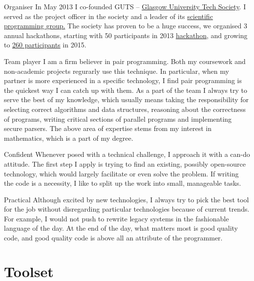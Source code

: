 \documentclass{tccv}
\begin{document}
\begin{skillist}
\item{Organiser} {In May 2013 I co-founded GUTS -- \href{http://gutechsoc.com}{Glasgow University Tech Society}. I served as the project officer in the society and a leader of its \href{http://fb.com/groups/scientificProgramming} {scientific programming group.} The society has proven to be a huge success, we organised 3 annual hackathons, starting with 50 participants in 2013 \href{http://storify.com/Eventhread/gu-hackaton}{hackathon}, and growing to \href{http://www.eventbrite.co.uk/e/glasgow-university-hackathon-2015-tickets-18613547622}{260 participants} in 2015.}
\item{Team player} {I am a firm believer in pair programming. Both my coursework and non-academic projects regurarly use this technique. In particular, when my partner is more experienced in a specific technology, I find pair programming is the quickest way I can catch up with them. As a part of the team I always try to serve the best of my knowledge, which usually means taking the responsibility for selecting correct algorithms and data structures, reasoning about the correctness of programs, writing critical sections of parallel programs and implementing secure parsers. The above area of expertise stems from my interest in mathematics, which is a part of my degree.}
\item{Confident} {Whenever posed with a technical challenge, I approach it with a can-do attitude. The first step I apply is trying to find an existing, possibly open-source technology, which would largely facilitate or even solve the problem. If writing the code is a necessity, I like to split up the work into small, manageable tasks.}
\item{Practical} {Although excited by new technologies, I always try to pick the best tool for the job without disregarding particular technologies because of current trends. For example, I would not push to rewrite legacy systems in the fashionable language of the day.  At the end of the day, what matters most is good quality code, and good quality code is above all an attribute of the programmer.}
\end{skillist}


\section{Toolset}
\end{document}

